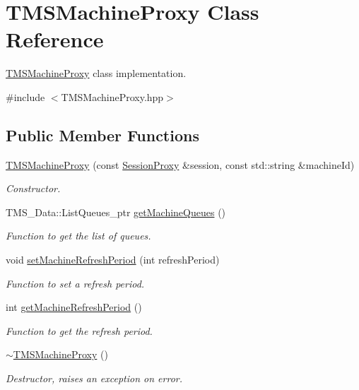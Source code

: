 \hypertarget{classTMSMachineProxy}{
\section{TMSMachineProxy Class Reference}
\label{classTMSMachineProxy}
}


\hyperlink{classTMSMachineProxy}{TMSMachineProxy} class implementation.  




{\ttfamily \#include $<$TMSMachineProxy.hpp$>$}

\subsection*{Public Member Functions}
\begin{DoxyCompactItemize}
\item 
\hyperlink{classTMSMachineProxy_a1d7f7c45e61a704c1c9bd4d8705c546d}{TMSMachineProxy} (const \hyperlink{classSessionProxy}{SessionProxy} \&session, const std::string \&machineId)
\begin{DoxyCompactList}\small\item\em Constructor. \item\end{DoxyCompactList}\item 
TMS\_\-Data::ListQueues\_\-ptr \hyperlink{classTMSMachineProxy_a69461479e859b27a3711bb05601014e0}{getMachineQueues} ()
\begin{DoxyCompactList}\small\item\em Function to get the list of queues. \item\end{DoxyCompactList}\item 
void \hyperlink{classTMSMachineProxy_afb83c1d71b90f674d008195745c114ce}{setMachineRefreshPeriod} (int refreshPeriod)
\begin{DoxyCompactList}\small\item\em Function to set a refresh period. \item\end{DoxyCompactList}\item 
int \hyperlink{classTMSMachineProxy_a24276625c96bcf88b04a2ac2703a2cf6}{getMachineRefreshPeriod} ()
\begin{DoxyCompactList}\small\item\em Function to get the refresh period. \item\end{DoxyCompactList}\item 
\hypertarget{classTMSMachineProxy_a10f56f9642f3a66988c306e972acd7b4}{
\hyperlink{classTMSMachineProxy_a10f56f9642f3a66988c306e972acd7b4}{$\sim$TMSMachineProxy} ()}
\label{classTMSMachineProxy_a10f56f9642f3a66988c306e972acd7b4}

\begin{DoxyCompactList}\small\item\em Destructor, raises an exception on error. \item\end{DoxyCompactList}\end{DoxyCompactItemize}
